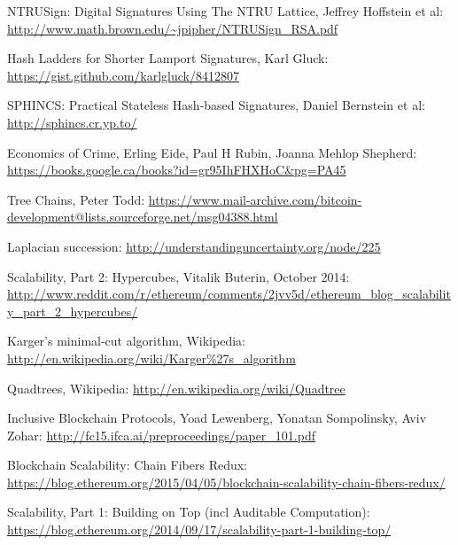 \documentclass[11pt,a4paper]{article}
\theoremstyle{plain}
\theoremstyle{definition}
\theoremstyle{remark}
\begin{document}
\begin{thebibliography}{40}
    NTRUSign: Digital Signatures Using The NTRU Lattice, Jeffrey Hoffstein et al: \url{http://www.math.brown.edu/~jpipher/NTRUSign_RSA.pdf}

    Hash Ladders for Shorter Lamport Signatures, Karl Gluck: \url{https://gist.github.com/karlgluck/8412807}

    SPHINCS: Practical Stateless Hash-based Signatures, Daniel Bernstein et al: \url{http://sphincs.cr.yp.to/}

    Economics of Crime, Erling Eide, Paul H Rubin, Joanna Mehlop Shepherd: \url{https://books.google.ca/books?id=gr95IhFHXHoC&pg=PA45}

    Tree Chains, Peter Todd: \url{https://www.mail-archive.com/bitcoin-development@lists.sourceforge.net/msg04388.html}

    Laplacian succession: \url{http://understandinguncertainty.org/node/225}

    Scalability, Part 2: Hypercubes, Vitalik Buterin, October 2014: \url{http://www.reddit.com/r/ethereum/comments/2jvv5d/ethereum_blog_scalability_part_2_hypercubes/}

    Karger's minimal-cut algorithm, Wikipedia: \url{http://en.wikipedia.org/wiki/Karger%27s_algorithm}

    Quadtrees, Wikipedia: \url{http://en.wikipedia.org/wiki/Quadtree}

    Inclusive Blockchain Protocols, Yoad Lewenberg, Yonatan Sompolinsky, Aviv Zohar: \url{http://fc15.ifca.ai/preproceedings/paper_101.pdf}

    Blockchain Scalability: Chain Fibers Redux: \url{https://blog.ethereum.org/2015/04/05/blockchain-scalability-chain-fibers-redux/}

    Scalability, Part 1: Building on Top (incl Auditable Computation): \url{https://blog.ethereum.org/2014/09/17/scalability-part-1-building-top/}

\end{thebibliography}
\end{document}

